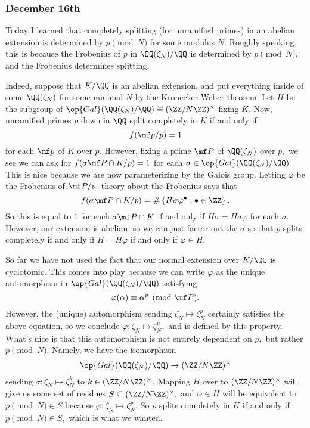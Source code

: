 \subsubsection{December 16th}
Today I learned that completely splitting (for unramified primes) in an abelian extension is determined by $p\pmod N$ for some modulus $N.$ Roughly speaking, this is because the Frobenius of $p$ in $\QQ(\zeta_N)/\QQ$ is determined by $p\pmod N,$ and the Frobenius determines splitting.

Indeed, suppose that $K/\QQ$ is an abelian extension, and put everything inside of some $\QQ(\zeta_N)$ for some minimal $N$ by the Kronecker-Weber theorem. Let $H$ be the subgroup of $\op{Gal}(\QQ(\zeta_N)/\QQ)\cong(\ZZ/N\ZZ)^\times$ fixing $K.$ Now, unramified primes $p$ down in $\QQ$ split completely in $K$ if and only if
\[f(\mf p/p)=1\]
for each $\mf p$ of $K$ over $p.$ However, fixing a prime $\mf P$ of $\QQ(\zeta_N)$ over $p,$ we see we can ask for $f(\sigma\mf P\cap K/p)=1$ for each $\sigma\in\op{Gal}(\QQ(\zeta_N)/\QQ).$ This is nice because we are now parameterizing by the Galois group. Letting $\varphi$ be the Frobenius of $\mf P/p,$ theory about the Frobenius says that
\[f(\sigma\mf P\cap K/p)=\#\left\{H\sigma\varphi^\bullet:\bullet\in\ZZ\right\}.\]
So this is equal to $1$ for each $\sigma\mf P\cap K$ if and only if $H\sigma=H\sigma\varphi$ for each $\sigma.$ However, our extension is abelian, so we can just factor out the $\sigma$ so that $p$ splits completely if and only if $H=H\varphi$ if and only if $\varphi\in H.$

So far we have not used the fact that our normal extension over $K/\QQ$ is cyclotomic. This comes into play because we can write $\varphi$ as the unique automorphism in $\op{Gal}(\QQ(\zeta_N)/\QQ)$ satisfying
\[\varphi(\alpha)\equiv\alpha^p\pmod{\mf P}.\]
However, the (unique) automorphism sending $\zeta_N\mapsto\zeta_N^p$ certainly satisfies the above equation, so we conclude $\varphi:\zeta_N\mapsto\zeta_N^p,$ and is defined by this property. What's nice is that this automorphism is not entirely dependent on $p,$ but rather $p\pmod N.$ Namely, we have the isomorphism
\[\op{Gal}(\QQ(\zeta_N)/\QQ)\to(\ZZ/N\ZZ)^\times\]
sending $\sigma:\zeta_N\mapsto\zeta_N^k$ to $k\in(\ZZ/N\ZZ)^\times.$ Mapping $H$ over to $(\ZZ/N\ZZ)^\times$ will give us some set of residues $S\subseteq(\ZZ/N\ZZ)^\times,$ and $\varphi\in H$ will be equivalent to $p\pmod N\in S$ because $\varphi:\zeta_N\mapsto\zeta_N^p.$ So $p$ splits completely in $K$ if and only if $p\pmod N\in S,$ which is what we wanted.

